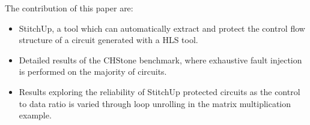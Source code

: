 

The contribution of this paper are:
\begin{itemize}[leftmargin=*]
	\setlength{\itemsep}{1pt}
	\setlength{\parskip}{0pt}
	\setlength{\parsep}{0pt}
	\item StitchUp, a tool which can automatically extract and protect the control flow structure of a circuit generated with a HLS tool.
	\item Detailed results of the CHStone benchmark, where exhaustive fault injection is performed on the majority of circuits.
	\item Results exploring the reliability of StitchUp protected circuits as the control to data ratio is varied through
	loop unrolling in the matrix multiplication example.
\end{itemize}

